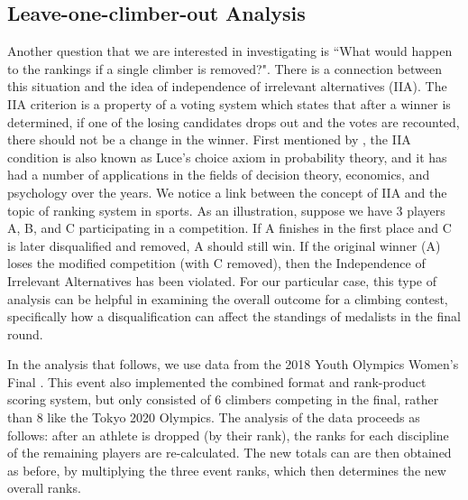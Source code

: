 \documentclass[letterpaper, inpress]{jds} %
\begin{document}
\subsection{Leave-one-climber-out
Analysis}
\label{leave-one-climber-out-analysis}

Another question that we are interested in investigating is ``What would happen to the rankings if a single climber is removed?". There is a connection between this situation and the idea of independence of irrelevant alternatives (IIA). The IIA criterion is a property of a voting system which states that after a winner is determined, if one of the losing candidates drops out and the votes are recounted, there should not be a change in the winner. First mentioned by \cite{arrow1951}, the IIA condition is also known as Luce's choice axiom \citep{luce1959} in probability theory, and it has had a number of applications in the fields of decision theory, economics, and psychology over the years. We notice a link between the concept of IIA and the topic of ranking system in sports. As an illustration, suppose we have 3 players A, B, and C participating in a competition. If A finishes in the first place and C is later disqualified and removed, A should still win. If the original winner (A) loses the modified competition (with C removed), then the Independence of Irrelevant Alternatives has been violated. For our particular case, this type of analysis can be helpful in examining the overall outcome for a climbing contest, specifically how a disqualification can affect the standings of medalists in the final round.

In the analysis that follows, we use data from the 2018 Youth Olympics Women's Final \citep{2018youth}. This event also implemented the combined format and rank-product scoring system, but only consisted of 6 climbers competing in the final, rather than 8 like the Tokyo 2020 Olympics. The analysis of the data proceeds as follows: after an athlete is dropped (by their rank), the ranks for each discipline of the remaining players are re-calculated. The new totals can are then obtained as before, by multiplying the three event ranks, which then determines the new overall ranks.
\end{document}
